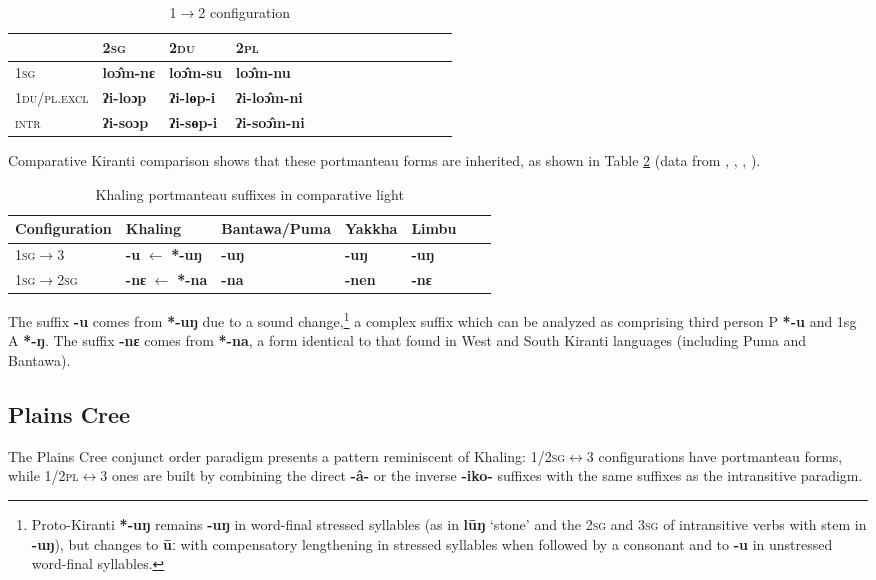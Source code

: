 \documentclass{article}
\newcommand{\ipa}[1]{{\phon\textbf{#1}}}
\newcommand{\bleu}[1]{\cellcolor{blue!20}\textbf{#1}}
\begin{document}
\begin{table}[H]
\caption{1$\rightarrow$2 configuration} \label{tab:loc} \centering
\begin{tabular}{llllllllllllll}
 \toprule
  &	\textsc{2sg} &	\textsc{2du} &	\textsc{2pl} &	\\
   \midrule
\textsc{1sg} &	\ipa{loɔ̂m-nɛ} \bleu{}&	\ipa{loɔ̂m-su} \bleu{}&	\ipa{loɔ̂m-nu} \bleu{}&	\\
\textsc{1du/pl.excl }&	\ipa{ʔi-loɔp} &	\ipa{ʔi-lɵp-i} &	\ipa{ʔi-loɔ̂m-ni} &	\\
\textsc{intr} &	\ipa{ʔi-soɔp} &	\ipa{ʔi-sɵp-i} &	\ipa{ʔi-soɔ̂m-ni} &	\\
 \bottomrule
\end{tabular}
\end{table}

Comparative Kiranti comparison shows that these portmanteau forms are inherited, as shown in Table \ref{tab:kiranti} (data from \citealt{driem87}, \citealt{doornenbal09},  \citealt{bickel07puma}, \citealt{schackow15yakkha}). 


\begin{table}[H]
\caption{Khaling portmanteau suffixes in comparative light} \label{tab:kiranti} \centering
\begin{tabular}{lllllll}
\toprule
Configuration &  Khaling & Bantawa/Puma & Yakkha& Limbu \\
\midrule
\textsc{1sg$\rightarrow$3} & \ipa{-u} $\leftarrow$ \ipa{*-uŋ} & \ipa{-uŋ} & \ipa{-uŋ} &\ipa{-uŋ} \\
\textsc{1sg$\rightarrow$2sg} &  \ipa{-nɛ} $\leftarrow$ \ipa{*-na} &  \ipa{-na} &  \ipa{-nen} & \ipa{-nɛ} & \\
 \bottomrule
\end{tabular}
\end{table}

The suffix \ipa{-u} comes from \ipa{*-uŋ} due to a sound change,\footnote{Proto-Kiranti \ipa{*-uŋ} remains \ipa{-uŋ} in word-final stressed syllables (as in \ipa{lūŋ} `stone' and the \textsc{2sg} and \textsc{3sg} of intransitive verbs with stem in \ipa{-uŋ}), but changes to \ipa{ūː} with compensatory lengthening in stressed syllables when followed by a consonant and to \ipa{-u} in unstressed word-final syllables. } a complex suffix which can be analyzed as comprising third person P \ipa{*-u} and 1sg A \ipa{*-ŋ}. The suffix \ipa{-nɛ} comes from \ipa{*-na}, a form identical to that found in West and South Kiranti languages (including Puma and Bantawa).


\subsection{Plains Cree} \label{sec:cree}
The Plains Cree conjunct order paradigm presents  a pattern reminiscent of Khaling: 1/\textsc{2sg$\leftrightarrow$3} configurations have portmanteau forms, while 1/\textsc{2pl$\leftrightarrow$3} ones are built by combining the direct \ipa{-â-} or the inverse \ipa{-iko-} suffixes with the same suffixes as the intransitive paradigm.
\end{document}
